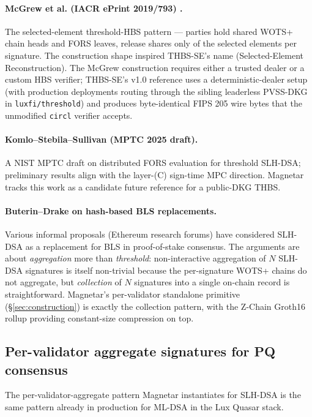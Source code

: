 \paragraph{McGrew et al. (IACR ePrint 2019/793) \cite{mcgrew2019}.}
The selected-element threshold-HBS pattern --- parties hold shared
WOTS+ chain heads and FORS leaves, release shares only of the
selected elements per signature. The construction shape inspired
THBS-SE's name (Selected-Element Reconstruction). The McGrew
construction requires either a trusted dealer or a custom HBS
verifier; THBS-SE's v1.0 reference uses a deterministic-dealer
setup (with production deployments routing through the sibling
leaderless PVSS-DKG in \texttt{luxfi/threshold}) and produces
byte-identical FIPS 205 wire bytes that the unmodified
\texttt{circl} verifier accepts.

\paragraph{Komlo--Stebila--Sullivan (MPTC 2025 draft).} A NIST MPTC
draft on distributed FORS evaluation for threshold SLH-DSA;
preliminary results align with the layer-(C) sign-time MPC
direction. Magnetar tracks this work as a candidate future
reference for a public-DKG THBS.

\paragraph{Buterin--Drake on hash-based BLS replacements.} Various
informal proposals (Ethereum research forums) have considered
SLH-DSA as a replacement for BLS in proof-of-stake consensus. The
arguments are about \emph{aggregation} more than \emph{threshold}:
non-interactive aggregation of $N$ SLH-DSA signatures is itself
non-trivial because the per-signature WOTS+ chains do not
aggregate, but \emph{collection} of $N$ signatures into a single
on-chain record is straightforward. Magnetar's per-validator
standalone primitive (\S\ref{sec:construction}) is exactly the
collection pattern, with the Z-Chain Groth16 rollup providing
constant-size compression on top.

\subsection{Per-validator aggregate signatures for PQ consensus}
\label{sec:related:per-validator-aggregate}

The per-validator-aggregate pattern Magnetar instantiates for
SLH-DSA is the same pattern already in production for ML-DSA in
the Lux Quasar stack.

